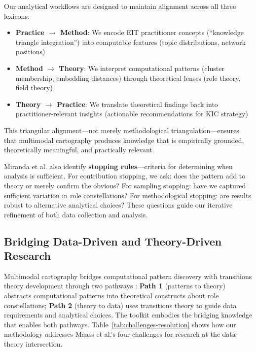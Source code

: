 \documentclass[../main.tex]{subfiles}
\begin{document}
\begin{insightbox}
Our analytical workflows are designed to maintain alignment across all three lexicons:
\begin{itemize}[nosep, leftmargin=*]
\item \textbf{Practice $\rightarrow$ Method}: We encode EIT practitioner concepts (``knowledge triangle integration'') into computable features (topic distributions, network positions)
\item \textbf{Method $\rightarrow$ Theory}: We interpret computational patterns (cluster membership, embedding distances) through theoretical lenses (role theory, field theory)
\item \textbf{Theory $\rightarrow$ Practice}: We translate theoretical findings back into practitioner-relevant insights (actionable recommendations for KIC strategy)
\end{itemize}
This triangular alignment---not merely methodological triangulation---ensures that multimodal cartography produces knowledge that is empirically grounded, theoretically meaningful, and practically relevant.
\end{insightbox}

Miranda et al. also identify \textbf{stopping rules}---criteria for determining when analysis is sufficient. For contribution stopping, we ask: does the pattern add to theory or merely confirm the obvious? For sampling stopping: have we captured sufficient variation in role constellations? For methodological stopping: are results robust to alternative analytical choices? These questions guide our iterative refinement of both data collection and analysis.

\subsection{Bridging Data-Driven and Theory-Driven Research}

Multimodal cartography bridges computational pattern discovery with transitions theory development through two pathways \cite{maass2018data}: \textbf{Path 1} (patterns to theory) abstracts computational patterns into theoretical constructs about role constellations; \textbf{Path 2} (theory to data) uses transitions theory to guide data requirements and analytical choices. The \RoleBox{} toolkit embodies the bridging knowledge that enables both pathways. Table~\ref{tab:challenges-resolution} shows how our methodology addresses Maass et al.'s four challenges for research at the data-theory intersection.
\end{document}
